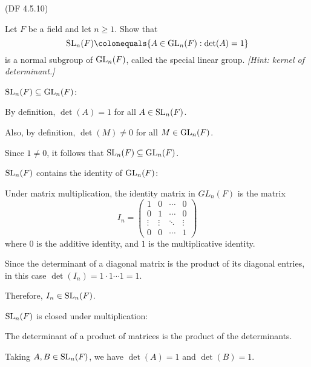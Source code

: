 \begin{problem}{(\textsf{DF 4.5.10})}
  \begin{enumalph}
    \item Let $F$ be a field and let $n \geq 1$.
      Show that \[ \SL_n(F) \colonequals \{A \in \GL_n(F) : \det(A)=1\} \]
      is a normal subgroup of $\mathrm{GL}_n(F)$, called the \textsf{special linear group}.
      \emph{[Hint: kernel of determinant.]}

      \begin{Answer}
        \begin{enumalph}
          \item  $\operatorname{SL}_n(F) \subseteq \mathrm{GL}_n(F)$:
            
            \noindent
            By definition, $\det(A)=1$ for all $A \in \operatorname{SL}_n(F)$.

            \noindent
            Also, by definition, $\det(M) \neq 0$ for all $M \in \mathrm{GL}_n(F)$.

            \noindent
            Since $1 \neq 0$, it follows that  $\operatorname{SL}_n(F) \subseteq \mathrm{GL}_n(F)$.
          \item  $\operatorname{SL}_n(F)$ contains the identity of $\mathrm{GL}_n(F)$:
          
            \noindent
            Under matrix multiplication, the identity matrix
            in $GL_n(F)$ is the matrix
            \[I_n = \begin{pmatrix}
              1 & 0 & \cdots & 0 \\
              0 & 1 & \cdots & 0 \\
              \vdots & \vdots & \ddots & \vdots \\
              0 & 0 & \cdots & 1
            \end{pmatrix}\]
            where $0$ is the additive identity, and $1$ is the multiplicative identity.

            \noindent
            Since the determinant of a diagonal matrix is the product of its diagonal entries,
            in this case $\det(I_n) = 1 \cdot 1 \cdots 1 = 1$.

            \noindent
            Therefore, $I_n \in \operatorname{SL}_n(F)$.
          \item  $\operatorname{SL}_n(F)$ is closed under multiplication:
          
            \noindent
            The determinant of a product of matrices is the product of the determinants.

            \noindent
            Taking $A,B \in \operatorname{SL}_n(F)$, we have $\det(A) = 1$ and $\det(B) = 1$.


\end{enumalph}
\end{Answer}
\end{enumalph}
\end{problem}
